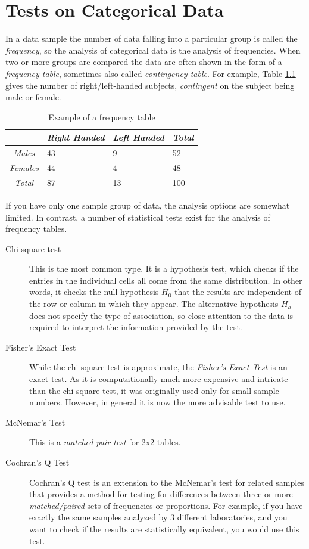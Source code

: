 \chapter{Tests on Categorical Data }

In a data sample the number of data falling into a particular group is called the \emph{frequency}, so the analysis of categorical data is the analysis of frequencies. When two or more groups are compared the data are often shown in the form of a \emph{frequency table}, sometimes also called \emph{contingency table}. For example, Table \ref{table:frequency} gives the number of right/left-handed subjects, \emph{contingent} on the subject being male or female.

\begin{table}
  \centering
  \begin{tabular}{|c|l l l|}
  \hline
  & \emph{Right Handed} & \emph{Left Handed} & \emph{Total} \\
  \hline
  \emph{Males} & 43 & 9 & 52 \\
  \emph{Females} & 44 & 4 & 48 \\
  \emph{Total} & 87 & 13 & 100 \\
  \hline
  \end{tabular}

  \caption{Example of a frequency table}\label{table:frequency}
\end{table}

If you have only one sample group of data, the analysis options are somewhat limited. In contrast, a number of statistical tests exist for the analysis of frequency tables.

\begin{description}
  \item[Chi-square test] This is the most common type. It is a hypothesis test, which checks if the entries in the individual cells all come from the same distribution. In other words, it checks the null hypothesis $H_0$ that the results are independent of the row or column in which they appear. The alternative hypothesis $H_a$ does not specify the type of association, so close attention to the data is required to interpret the information provided by the test.
  \item[Fisher's Exact Test] While the chi-square test is approximate, the \emph{Fisher's Exact Test} is an exact test. As it is computationally much more expensive and intricate than the chi-square test, it was originally used only for small sample numbers. However, in general it is now the more advisable test to use.
  \item[McNemar's Test]  This is a \emph{matched pair test }for 2x2 tables.
  \item[Cochran's Q Test]  Cochran's Q test is an extension to the McNemar's test for related samples that provides a method for testing for differences between three or more \emph{matched/paired} sets of frequencies or proportions. For example, if you have exactly the same samples analyzed by 3 different laboratories, and you want to check if the results are statistically equivalent, you would use this test.
\end{description}


